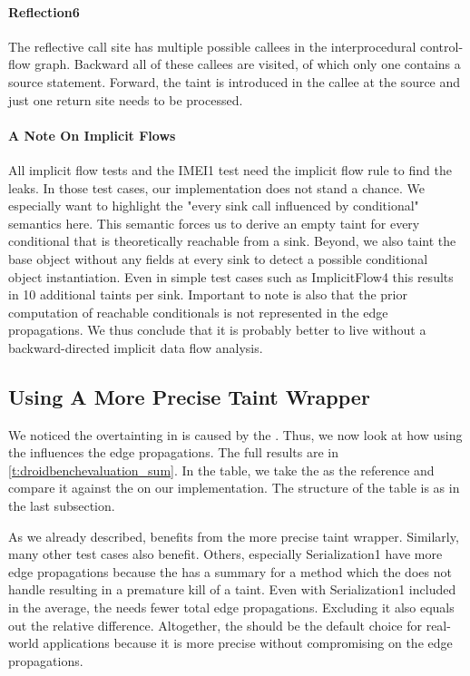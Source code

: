 \documentclass[../draft.tex]{subfiles}
\begin{document}
    \paragraph{Reflection6}
    The reflective call site has multiple possible callees in the interprocedural control-flow graph.
    Backward all of these callees are visited, of which only one contains a source statement.
    Forward, the taint is introduced in the callee at the source and just one return site needs to be processed.

    \paragraph{A Note On Implicit Flows}
    All implicit flow tests and the IMEI1 test need the implicit flow rule to find the leaks.
    In those test cases, our implementation does not stand a chance.
    We especially want to highlight the "every sink call influenced by conditional" semantics here.
    This semantic forces us to derive an empty taint for every conditional that is theoretically reachable from a sink.
    Beyond, we also taint the base object without any fields at every sink to detect a possible conditional object instantiation.
    Even in simple test cases such as ImplicitFlow4 this results in 10 additional taints per sink.
    Important to note is also that the prior computation of reachable conditionals is not represented in the edge propagations.
    We thus conclude that it is probably better to live without a backward-directed implicit data flow analysis.

    \subsection{Using A More Precise Taint Wrapper}
    We noticed the overtainting in  is caused by the .
    Thus, we now look at how using the  influences the edge propagations.
    The full results are in \autoref{t:droidbenchevaluation_sum}.
    In the table, we take the  as the reference and compare it against the  on our implementation.
    The structure of the table is as in the last subsection.

    As we already described,  benefits from the more precise taint wrapper.
    Similarly, many other test cases also benefit.
    Others, especially Serialization1 have more edge propagations because the  has a summary for a method which the  does not handle\footnotemark{} resulting in a premature kill of a taint.
    Even with Serialization1 included in the average, the  needs fewer total edge propagations.
    Excluding it also equals out the relative difference.
    Altogether, the  should be the default choice for real-world applications because it is more precise without compromising on the edge propagations.
\end{document}
